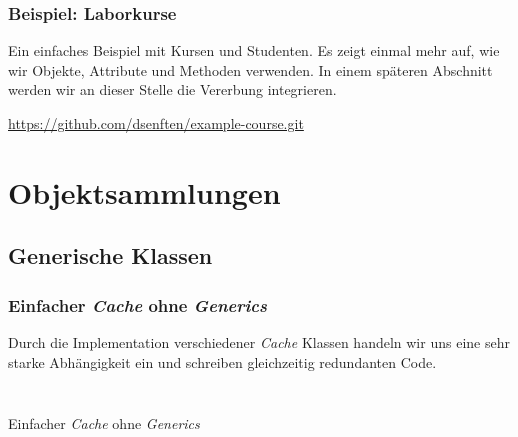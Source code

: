 \begin{Exercise}[%
title={Verwalten von Studenten und Kursbelegungen},
label={ex:course}]

    \begin{frame}[fragile]
        \frametitle<presentation>{Beispiel: Laborkurse}
        Ein einfaches Beispiel mit Kursen und Studenten. Es zeigt einmal mehr auf, wie wir
        Objekte, Attribute und Methoden verwenden. In einem späteren Abschnitt werden wir
        an dieser Stelle die Vererbung integrieren.

        \href{https://github.com/dsenften/example-course.git}
        {https://github.com/dsenften/example-course.git}

    \end{frame}

\end{Exercise}


\section{Objektsammlungen}
\label{sec:collections}

\subsection{Generische Klassen}
\label{subsec:generics}

\begin{frame}[fragile]
    \frametitle<presentation>{Einfacher \emph{Cache} ohne \emph{Generics}}
\end{frame}


\mode*
Durch die Implementation verschiedener \emph{Cache} Klassen handeln wir
uns eine sehr starke Abhängigkeit ein und schreiben gleichzeitig redundanten
Code.


\begin{listing}[ht]
    \begin{center}
        \begin{minipage}{0.45\textwidth}
            \inputminted[frame=single,lixnenos]{java}{../java/generics/CacheString.java}
        \end{minipage}
        \begin{minipage}{0.45\textwidth}
            \inputminted[frame=single]{java}{../java/generics/CacheShirt.java}
        \end{minipage}
        \caption{Einfacher \emph{Cache} ohne \emph{Generics}}
        \label{lst:non-generic-classes}
    \end{center}
\end{listing}


